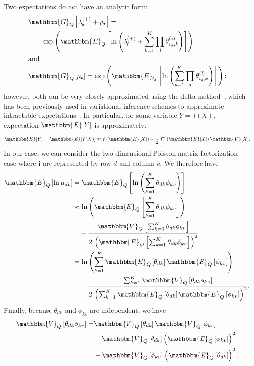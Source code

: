 \documentclass[letterpaper]{article}
\newcommand{\subs}{\pmb{i}}
\newcommand{\wsup}[2]{#1_{\subs}^{(#2)}}
\newcommand{\lamP}{\wsup{\lambda}{+}}
\newcommand{\Eq}[1]{\mathbbm{E}_Q\left[#1\right]}
\newcommand{\Vq}[1]{\mathbbm{V}_Q\left[#1\right]}
\newcommand{\Gq}[1]{\mathbbm{G}_Q\left[#1\right]}
\begin{document}
  Two expectations do not have an analytic form:
  \begin{align}
  &\Gq{\lamP + \mu_{\subs}} = \notag \\
    &\quad\quad \exp\left(\Eq{\ln \left(\lamP
    + \sum_{k=1}^K \prod_d \theta_{i_d,k}^{(i)} \right)}\right) \\
  \intertext{and}
  &\Gq{\mu_{\subs}} = \exp\left(\Eq{\ln \left(\sum_{k=1}^K \prod_d \theta_{i_d,k}^{(i)} \right)}\right);
  \end{align}
  however, both can be very closely approximated using the delta
  method~\citep{ver2012invented}, which has been previously used in variational
  inference schemes to approximate intractable
  expectations~\citep{braun2010variational,wang2013variational}. In particular,
  for some variable $Y = f(X)$, expectation $\mathbbm{E}[Y]$ is approximately:
  \begin{equation}
  \mathbbm{E}[Y] = \mathbbm{E}[f(X)] \approx f\left(\mathbbm{E}[X]\right) + \frac{1}{2} \, f''\left(\mathbbm{E}[X]\right) \mathbbm{V}[X].
  \end{equation}
  In our case, we can consider the two-dimensional Poisson matrix factorization
  case where $\subs$ are represented by row $d$ and column $v$. We therefore
  have
  \begin{align}
  \Eq{\ln \mu_{dv}} &= \Eq{\ln\left(\sum_{k=1}^K \theta_{dk}\phi_{kv}\right)} \notag \\
  &\approx \ln\left(\Eq{\sum_{k=1}^K \theta_{dk}\phi_{kv}}\right) \notag \\
  &\quad - \frac{\mathbbm{V}_{Q}\left[\sum_{k=1}^K \theta_{dk} \phi_{kv}\right]}{2 \, \left(\Eq{\sum_{k=1}^K \theta_{dk} \phi_{kv}}\right)^2} \notag \\
  &=\ln\left(\sum_{k=1}^K \Eq{\theta_{dk}}\Eq{\phi_{kv}}\right) \notag \\
  &\quad - \frac{\sum_{k=1}^K \Vq{\theta_{dk} \phi_{kv}}}{2 \, \left(\sum_{k=1}^K \Eq{\theta_{dk}} \Eq{\phi_{kv}}\right)^2}.
  \end{align}
  Finally, because $\theta_{dk}$ and $\phi_{kv}$ are independent, we have
  \begin{align}
  \Vq{\theta_{dk} \phi_{kv}} =& \Vq{\theta_{dk}} \Vq{\phi_{kv}} \notag \\
  &+ \Vq{\theta_{dk}} \left(\Eq{\phi_{kv}}\right)^2 \notag \\
  &+ \Vq{\phi_{kv}} \left(\Eq{\theta_{dk}}\right)^2.
  \end{align}
\end{document}
